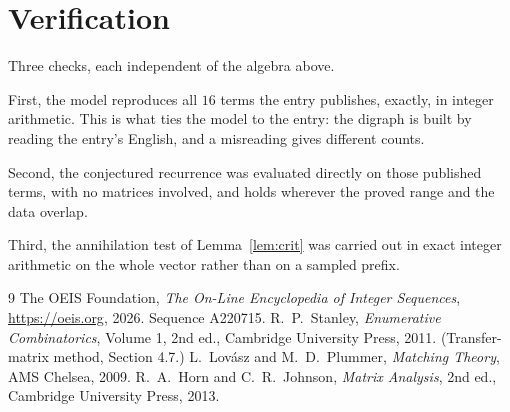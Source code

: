 \documentclass[11pt,a4paper]{article}
\theoremstyle{plain}
\theoremstyle{definition}
\begin{document}
\section{Verification}

Three checks, each independent of the algebra above.

First, the model reproduces all $16$ terms the entry publishes, exactly, in integer
arithmetic. This is what ties the model to the entry: the digraph is built by reading the
entry's English, and a misreading gives different counts.

Second, the conjectured recurrence was evaluated directly on those published terms, with no
matrices involved, and holds wherever the proved range and the data overlap.

Third, the annihilation test of Lemma~\ref{lem:crit} was carried out in exact integer
arithmetic on the whole vector rather than on a sampled prefix.

\begin{thebibliography}{9}
 The OEIS Foundation, \emph{The On-Line Encyclopedia of Integer
Sequences}, \url{https://oeis.org}, 2026. Sequence A220715.
 R.~P.~Stanley, \emph{Enumerative Combinatorics}, Volume 1, 2nd ed.,
Cambridge University Press, 2011. (Transfer-matrix method, Section 4.7.)
 L.~Lov\'asz and M.~D.~Plummer, \emph{Matching Theory}, AMS Chelsea,
2009.
 R.~A.~Horn and C.~R.~Johnson, \emph{Matrix Analysis}, 2nd ed., Cambridge
University Press, 2013.
\end{thebibliography}
\end{document}
